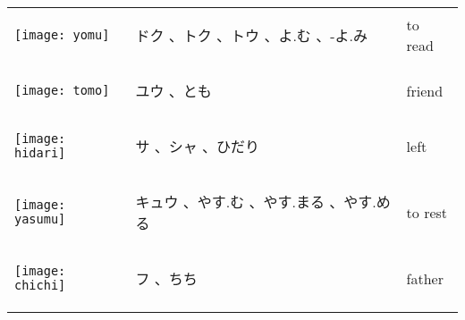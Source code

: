 \documentclass[a4paper,12pt]{extarticle}
\begin{document}
\begin{longtable}{|lp{6cm}p{4cm}|}
\begin{minipage}{0.3\textwidth}
\centerline{
	\texttt{[image: yomu]}
}
\end{minipage}
&
\begin{CJK}{UTF8}{min} ドク 、トク 、トウ 、よ.む 、-よ.み\end{CJK}
&
 to read
\\ 
\begin{minipage}{0.3\textwidth}
\centerline{
	\texttt{[image: tomo]}
}
\end{minipage}
&
\begin{CJK}{UTF8}{min} ユウ 、とも\end{CJK}
&
friend
\\ 
\begin{minipage}{0.3\textwidth}
\centerline{
	\texttt{[image: hidari]}
}
\end{minipage}
&
\begin{CJK}{UTF8}{min} サ 、シャ 、ひだり\end{CJK}
&
 left
\\ 
\begin{minipage}{0.3\textwidth}
\centerline{
	\texttt{[image: yasumu]}
}
\end{minipage}
&
\begin{CJK}{UTF8}{min} キュウ 、やす.む 、やす.まる 、やす.める\end{CJK}
&
 to rest
\\ 
\begin{minipage}{0.3\textwidth}
\centerline{
	\texttt{[image: chichi]}
}
\end{minipage}
&
\begin{CJK}{UTF8}{min}フ 、ちち\end{CJK}
&
 father
\\ 
\begin{minipage}{0.3\textwidth}

\end{minipage}
\end{longtable}
\end{document}
